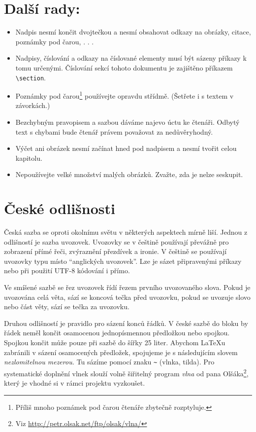 \documentclass[10pt, a4paper, twocolumn]{article}
\begin{document}
\section{Další rady:}
\label{section: Dalsi rady}

\begin{itemize}
\item Nadpis nesmí končit dvojtečkou a nesmí obsahovat
odkazy na obrázky, citace, poznámky pod čarou, . . .
\item Nadpisy, číslování a odkazy na číslované elementy musí být sázeny příkazy k tomu určenými.
Číslování sekcí tohoto dokumentu je zajištěno příkazem \verb|\section|.
\item Poznámky pod čarou\footnote[1]{Příliš mnoho poznámek pod čarou čtenáře zbytečně rozptyluje.} používejte opravdu střídmě.
(Šetřete i s textem v závorkách.)
\item Bezchybným pravopisem a sazbou dáváme najevo úctu ke čtenáři.
Odbytý text s chybami bude čtenář právem považovat za nedůvěryhodný.
\item Výčet ani obrázek nesmí začínat hned pod nadpisem a nesmí tvořit celou kapitolu.
\item Nepoužívejte velké množství malých obrázků.
Zvažte, zda je nelze seskupit.
\end{itemize}

\section{České odlišnosti}

Česká sazba se oproti okolnímu světu v některých aspektech mírně liší.
Jednou z odlišností je sazba uvozovek.
Uvozovky se v češtině používají převážně pro zobrazení přímé řeči, zvýraznění přezdívek a ironie.
V češtině se používají uvozovky typu  místo “anglických uvozovek”.
Lze je sázet připravenými příkazy nebo při použití UTF-8 kódování i přímo.

Ve smíšené sazbě se řez uvozovek řídí řezem prvního uvozovaného slova.
Pokud je uvozována celá věta, sází se koncová tečka před uvozovku, pokud se uvozuje slovo nebo část věty, sází se tečka za uvozovku.

Druhou odlišností je pravidlo pro sázení konců řádků.
V české sazbě do bloku by řádek neměl končit osamocenou jednopísmennou předložkou nebo spojkou.
Spojkou  končit může pouze při sazbě do šířky 25 liter.
Abychom \LaTeX u zabránili v sázení osamocených předložek, spojujeme je s následujícím slovem \emph{nezlomitelnou mezerou.}
Tu sázíme pomocí znaku \verb|~| (vlnka, tilda).
Pro systematické doplnění vlnek slouží volně šiřitelný program \emph{vlna} od pana Olšáka\footnote[2]{Viz \url {http://petr.olsak.net/ftp/olsak/vlna/} }, který je vhodné si v rámci projektu vyzkoušet.
\end{document}
